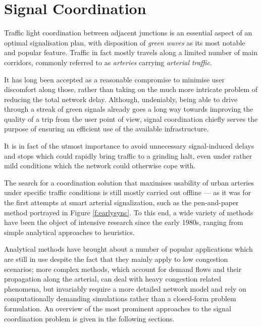 \section{Signal Coordination}

Traffic light coordination between adjacent junctions is an essential aspect of an
optimal signalisation plan, with disposition of \emph{green waves} as its most notable and popular
feature. Traffic in fact mostly travels along a limited number of main corridors, commonly referred
to as \emph{arteries} carrying \emph{arterial traffic}.

It has long been accepted as a reasonable compromise to minimise user discomfort along those, rather than taking on the much more intricate problem of reducing the total network delay.
Although, undeniably, being able to drive through a streak of green signals already goes a long way towards
improving the quality of a trip from the user point of view, signal coordination chiefly
serves the purpose of ensuring an efficient use of the available infrastructure.

It is in fact of the utmost importance to avoid unnecessary signal-induced delays and stops which could rapidly bring traffic to a grinding halt, even under rather mild conditions which the network could otherwise cope with.

The search for a coordination solution that maximises usability of urban arteries under specific traffic conditions is still mostly carried out offline — as it was for the first attempts at smart arterial signalization, such as the pen-and-paper method portrayed in Figure \ref{f:earlysync}.
To this end, a wide variety of methods have been the object of intensive research since the early 1980s, ranging from simple analytical approaches to heuristics.

Analytical methods have brought about a number of popular applications which are still in use despite the fact that they mainly apply to low congestion scenarios; more complex methods, which account for demand flows and their propagation along the arterial, can deal with heavy congestion related phenomena, but invariably require a more detailed network model and rely on computationally demanding simulations rather than a closed-form problem formulation. An overview of the most prominent approaches to the signal coordination problem is given in the following sections.

